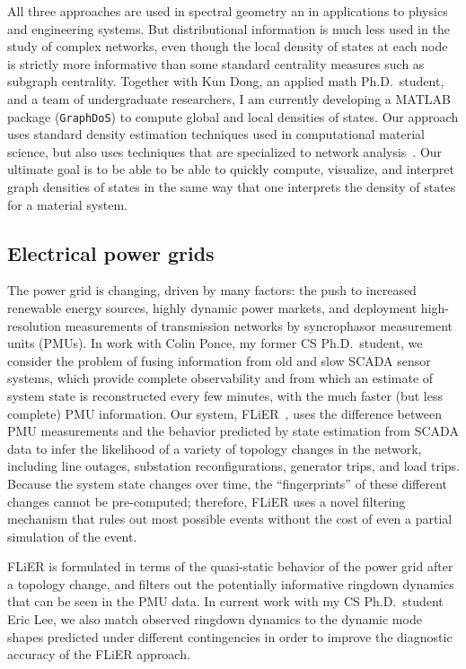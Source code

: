 \documentclass{amsart}
\begin{document}
All three approaches are used in spectral geometry an in applications to
physics and engineering systems.  But distributional information is much
less used in the study of complex networks, even though the local
density of states at each node is strictly more informative than
some standard centrality measures such as subgraph centrality.
Together with Kun Dong, an applied math Ph.D.~student, and a team of
undergraduate researchers, I am currently developing a MATLAB package
({\tt GraphDoS}) to compute global and local densities of states.
Our approach uses standard density estimation techniques used in
computational material science, but also uses techniques that are
specialized to network analysis~\cite{2015-siam-ns}.  Our ultimate
goal is to be able to be able to quickly compute, visualize, and
interpret graph densities of states in the same
way that one interprets the density of states for a material system.

\subsection*{Electrical power grids}


The power grid is changing, driven by many factors: the push to
increased renewable energy sources, highly dynamic power markets, and
deployment high-resolution measurements of transmission networks by
syncrophasor measurement units (PMUs).  In work with Colin Ponce,
my former CS Ph.D.~student, we consider the problem of fusing information
from old and slow SCADA sensor systems, which provide complete
observability and from which an estimate of system state is
reconstructed every few minutes, with the much faster (but less
complete) PMU information.  Our system, FLiER~\cite{2016-flier-tr},
uses the difference between PMU measurements and the
behavior predicted by state estimation from SCADA data to infer
the likelihood of a variety of topology changes in the network,
including line outages, substation reconfigurations, generator
trips, and load trips.  Because the system state changes over
time, the ``fingerprints'' of these different changes cannot be
pre-computed; therefore, FLiER uses a novel filtering mechanism
that rules out most possible events without
the cost of even a partial simulation of the event.

FLiER is formulated in terms of the quasi-static behavior of the
power grid after a topology change, and filters out the potentially
informative ringdown dynamics that can be seen in the PMU data.  In
current work with my CS Ph.D.~student Eric Lee, we also match observed
ringdown dynamics to the dynamic mode shapes predicted under different
contingencies in order to improve the diagnostic accuracy of the FLiER
approach.
\end{document}
